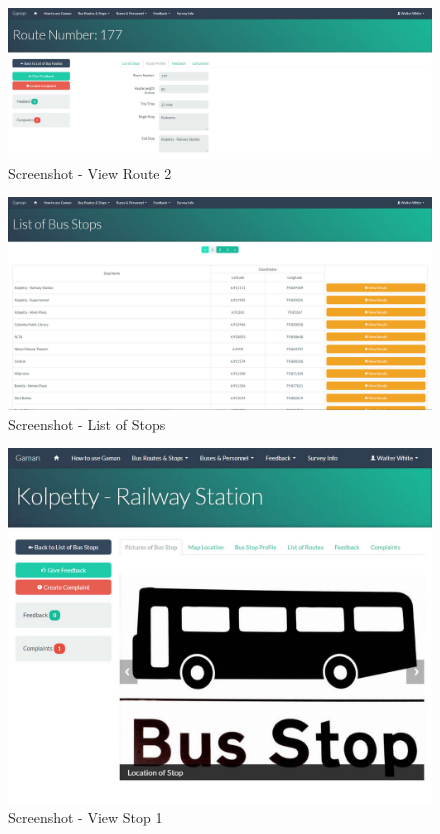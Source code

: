 \documentclass[12pt, oneside]{report}
\begin{document}
\begin {figure} [h!]
\centering
\includegraphics[scale=0.2]{viewRoute2}
\caption [Screenshot - View Route 2] {Screenshot - View Route 2}
\label {image-viewRoute2}
\end {figure}


\begin {figure} [h!]
\centering
\includegraphics[scale=0.2]{listStops}
\caption [Screenshot - List of Stops] {Screenshot - List of Stops}
\label {image-listStops}
\end {figure}


\begin {figure} [h!]
\centering
\includegraphics[scale=0.2]{viewStop1}
\caption [Screenshot - View Stop 1] {Screenshot - View Stop 1}
\label {image-viewStop1}
\end {figure}
\end{document}
